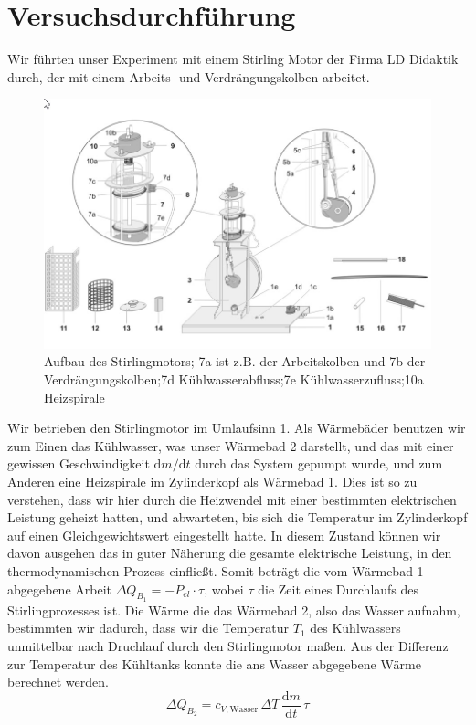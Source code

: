 \documentclass[a4paper, 12pt,]{scrartcl}
\begin{document}
\section{Versuchsdurchführung}
Wir führten unser Experiment mit einem Stirling Motor der Firma LD Didaktik durch, der mit einem Arbeits- und Verdrängungskolben arbeitet.
\begin{figure}[H]\centering\includegraphics[scale=0.8]{Stirlingmotor}\caption{Aufbau des Stirlingmotors; 7a ist z.B. der Arbeitskolben und 7b der Verdrängungskolben;7d Kühlwasserabfluss;7e Kühlwasserzufluss;10a Heizspirale}\end{figure}

Wir betrieben den Stirlingmotor im Umlaufsinn 1. Als Wärmebäder benutzen wir zum Einen das Kühlwasser, was unser Wärmebad 2 darstellt, und das mit einer gewissen Geschwindigkeit $\text{d}m/\text{d}t$ durch das System gepumpt wurde, und zum Anderen eine Heizspirale im Zylinderkopf als Wärmebad 1. Dies ist so zu verstehen, dass wir hier durch die Heizwendel mit einer bestimmten elektrischen Leistung geheizt hatten, und abwarteten, bis sich die Temperatur im Zylinderkopf auf einen Gleichgewichtswert eingestellt hatte. In diesem Zustand können wir davon ausgehen das in guter Näherung die gesamte elektrische Leistung, in den thermodynamischen Prozess einfließt. Somit beträgt die vom Wärmebad 1 abgegebene Arbeit $\Delta{Q_{B_1}}=-P_{el}\cdot{\tau}$, wobei $\tau$ die Zeit eines Durchlaufs des Stirlingprozesses ist.
Die Wärme die das Wärmebad 2, also das Wasser aufnahm, bestimmten wir dadurch, dass wir die Temperatur $T_1$ des Kühlwassers unmittelbar nach Druchlauf durch den Stirlingmotor maßen. Aus der Differenz zur Temperatur des Kühltanks konnte die ans Wasser abgegebene Wärme berechnet werden.
\begin{equation*}\Delta{Q_{B_2}}=c_{V,\text{Wasser}}\,\Delta{T}\,\frac{\text{d}m}{\text{d}t}\,\tau\end{equation*}
\end{document}
